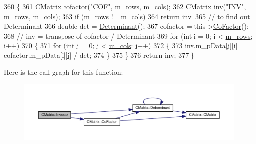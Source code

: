 \begin{DoxyCode}
360         \{
361             \hyperlink{classCMatrix}{CMatrix} cofactor(\textcolor{stringliteral}{"COF"}, \hyperlink{classCMatrix_ae23e5f8016ba06cfd1cce364a99f5037}{m\_rows}, \hyperlink{classCMatrix_a723f752208c055093012984eaddb62d3}{m\_cols});
362             \hyperlink{classCMatrix}{CMatrix} inv(\textcolor{stringliteral}{"INV"}, \hyperlink{classCMatrix_ae23e5f8016ba06cfd1cce364a99f5037}{m\_rows}, \hyperlink{classCMatrix_a723f752208c055093012984eaddb62d3}{m\_cols});
363             \textcolor{keywordflow}{if} (\hyperlink{classCMatrix_ae23e5f8016ba06cfd1cce364a99f5037}{m\_rows} != \hyperlink{classCMatrix_a723f752208c055093012984eaddb62d3}{m\_cols})
364                 \textcolor{keywordflow}{return} inv;
365             \textcolor{comment}{// to find out Determinant}
366             \textcolor{keywordtype}{double} det = \hyperlink{classCMatrix_a865ff8f610be372e666fbf24d5b73a3a}{Determinant}();
367             cofactor = this->\hyperlink{classCMatrix_acc5e18f7dac42418762e92ebd8d10840}{CoFactor}();
368             \textcolor{comment}{// inv = transpose of cofactor / Determinant}
369             \textcolor{keywordflow}{for} (\textcolor{keywordtype}{int} i = 0; i < \hyperlink{classCMatrix_ae23e5f8016ba06cfd1cce364a99f5037}{m\_rows}; i++)
370             \{
371                 \textcolor{keywordflow}{for} (\textcolor{keywordtype}{int} j = 0; j < \hyperlink{classCMatrix_a723f752208c055093012984eaddb62d3}{m\_cols}; j++)
372                 \{
373                     inv.m\_pData[j][i] = cofactor.m\_pData[i][j] / det;
374                 \}
375             \}
376             \textcolor{keywordflow}{return} inv;
377         \}
\end{DoxyCode}


Here is the call graph for this function\+:
\nopagebreak
\begin{figure}[H]
\begin{center}
\leavevmode
\includegraphics[width=350pt]{classCMatrix_abd58298df23c98b8675a81a70c6f140b_cgraph}
\end{center}
\end{figure}


